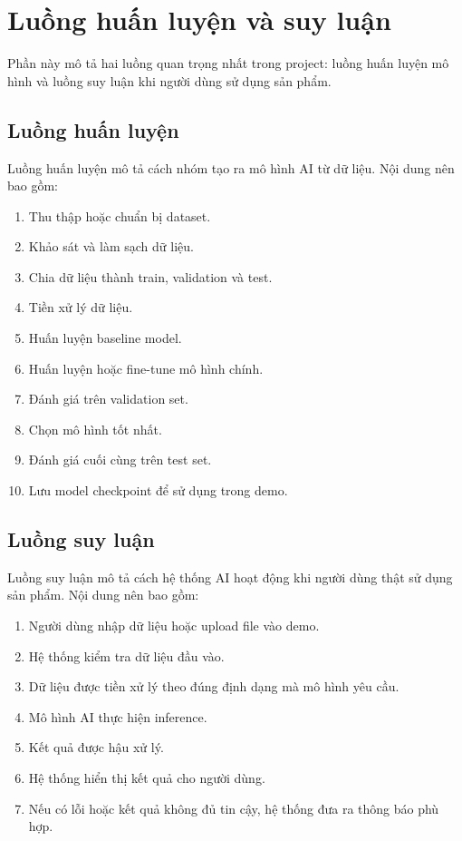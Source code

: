 \documentclass[12pt]{ai_conquer2026}
\begin{document}
\section{Luồng huấn luyện và suy luận}

Phần này mô tả hai luồng quan trọng nhất trong project: luồng huấn luyện mô hình và luồng suy luận khi người dùng sử dụng sản phẩm.

\subsection{Luồng huấn luyện}

Luồng huấn luyện mô tả cách nhóm tạo ra mô hình AI từ dữ liệu. Nội dung nên bao gồm:

\begin{enumerate}
\item Thu thập hoặc chuẩn bị dataset.
\item Khảo sát và làm sạch dữ liệu.
\item Chia dữ liệu thành train, validation và test.
\item Tiền xử lý dữ liệu.
\item Huấn luyện baseline model.
\item Huấn luyện hoặc fine-tune mô hình chính.
\item Đánh giá trên validation set.
\item Chọn mô hình tốt nhất.
\item Đánh giá cuối cùng trên test set.
\item Lưu model checkpoint để sử dụng trong demo.
\end{enumerate}

\subsection{Luồng suy luận}

Luồng suy luận mô tả cách hệ thống AI hoạt động khi người dùng thật sử dụng sản phẩm. Nội dung nên bao gồm:

\begin{enumerate}
\item Người dùng nhập dữ liệu hoặc upload file vào demo.
\item Hệ thống kiểm tra dữ liệu đầu vào.
\item Dữ liệu được tiền xử lý theo đúng định dạng mà mô hình yêu cầu.
\item Mô hình AI thực hiện inference.
\item Kết quả được hậu xử lý.
\item Hệ thống hiển thị kết quả cho người dùng.
\item Nếu có lỗi hoặc kết quả không đủ tin cậy, hệ thống đưa ra thông báo phù hợp.
\end{enumerate}
\end{document}
